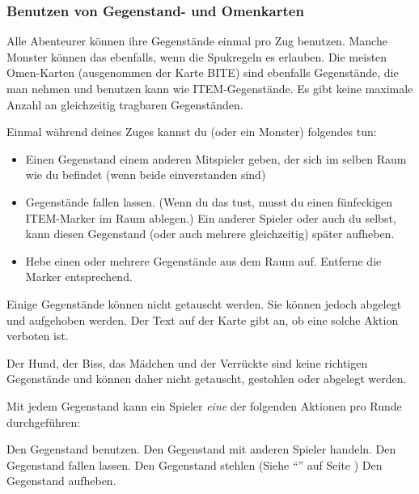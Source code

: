 %
%
%

\subsubsection{Benutzen von Gegenstand- und Omenkarten}
\label{kap:rule:useitemomen}

Alle Abenteurer können ihre Gegenstände einmal pro Zug benutzen. Manche Monster können das ebenfalls, wenn die Spukregeln es erlauben. Die meisten Omen-Karten (ausgenommen der Karte BITE) sind ebenfalls Gegenstände, die man nehmen und benutzen kann wie ITEM-Gegenstände. Es gibt keine maximale Anzahl an gleichzeitig tragbaren Gegenständen.

Einmal während deines Zuges kannst du (oder ein Monster) folgendes tun:
  \begin{itemize}
    \item Einen Gegenstand einem anderen Mitspieler geben, der sich im selben Raum wie du befindet (wenn beide einverstanden sind)
    \item Gegenstände fallen lassen. (Wenn du das tust, musst du einen fünfeckigen ITEM-Marker im Raum ablegen.) Ein anderer Spieler oder auch du selbst, kann diesen Gegenstand (oder auch mehrere gleichzeitig) später aufheben.
    \item Hebe einen oder mehrere Gegenstände aus dem Raum auf. Entferne die Marker entsprechend.
\end{itemize}

Einige Gegenstände können nicht getauscht werden. Sie können jedoch abgelegt und aufgehoben werden. Der Text auf der Karte gibt an, ob eine solche Aktion verboten ist.

Der Hund, der Biss, das Mädchen und der Verrückte sind keine richtigen Gegenstände und können daher nicht getauscht, gestohlen oder abgelegt werden.

Mit jedem Gegenstand kann ein Spieler  \emph{eine} der folgenden Aktionen pro Runde durchgeführen:

  \begin{itemize}
        \bitem Den Gegenstand benutzen.
        \bitem Den Gegenstand mit anderen Spieler handeln.
        \bitem Den Gegenstand fallen lassen.
        \bitem Den Gegenstand stehlen (Siehe ``'' auf Seite \pageref{kap:rule:specialattack})
        \bitem Den Gegenstand aufheben.
  \end{itemize}

